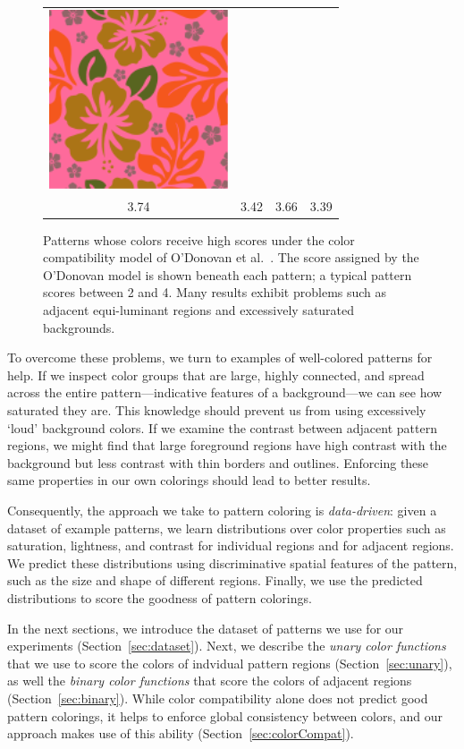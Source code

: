 \begin{figure}[htb]
\begin{tabular}{cccc}
\includegraphics[width=.2\columnwidth]{figs/colorCompat/r_1_3_3-39}\\
3.74&3.42&3.66&3.39\\
\end{tabular}
\caption{Patterns whose colors receive high scores under the color compatibility model of O'Donovan et al.~. The score assigned by the O'Donovan model is shown beneath each pattern; a typical pattern scores between 2 and 4. Many results exhibit problems such as adjacent equi-luminant regions and excessively saturated backgrounds.}
\label{fig:ColorCompatOnly}
\end{figure}

To overcome these problems, we turn to examples of well-colored patterns for help. If we inspect color groups that are large, highly connected, and spread across the entire pattern---indicative features of a background---we can see how saturated they are. This knowledge should prevent us from using excessively `loud' background colors. If we examine the contrast between adjacent pattern regions, we might find that large foreground regions have high contrast with the background but less contrast with thin borders and outlines. Enforcing these same properties in our own colorings should lead to better results.

Consequently, the approach we take to pattern coloring is \emph{data-driven}: given a dataset of example patterns, we learn distributions over color properties such as saturation, lightness, and contrast for individual regions and for adjacent regions. We predict these distributions using discriminative spatial features of the pattern, such as the size and shape of different regions. Finally, we use the predicted distributions to score the goodness of pattern colorings.

In the next sections, we introduce the dataset of patterns we use for our experiments (Section~\ref{sec:dataset}). Next, we describe the \emph{unary color functions} that we use to score the colors of indvidual pattern regions (Section~\ref{sec:unary}), as well the \emph{binary color functions} that score the colors of adjacent regions (Section~\ref{sec:binary}). While color compatibility alone does not predict good pattern colorings, it helps to enforce global consistency between colors, and our approach makes use of this ability (Section~\ref{sec:colorCompat}).

